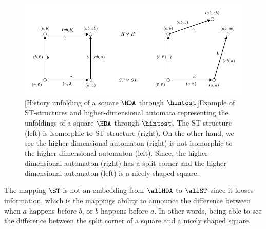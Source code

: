     \begin{figure}[ht]
        \centering
        \includegraphics[scale=0.9]{Figures/4.Relationship-with-other-models-of-concurrency/ST-structure-and-HDA/HDA-collapse.pdf}
        [History unfolding of a square $\HDA$ through $\hintost$]{Example of ST-structures and higher-dimensional automata representing the unfoldings of a square $\HDA$ through $\hintost$. The ST-structure (left) is isomorphic to ST-structure (right). On the other hand, we see the higher-dimensional automaton (right) is not isomorphic to the higher-dimensional automaton (left). Since, the higher-dimensional automaton (right) has a split corner and the higher-dimensional automaton (left) is a nicely shaped square.}
        \label{fig:Unfolding-HDA}
    \end{figure}
    
    The mapping $\ST$ is not an embedding from $\allHDA$ to $\allST$ since it looses information, which is the mappings ability to announce the difference between when $a$ happens before $b$, or $b$ happens before $a$. In other words, being able to see the difference between the split corner of a square and a nicely shaped square.







